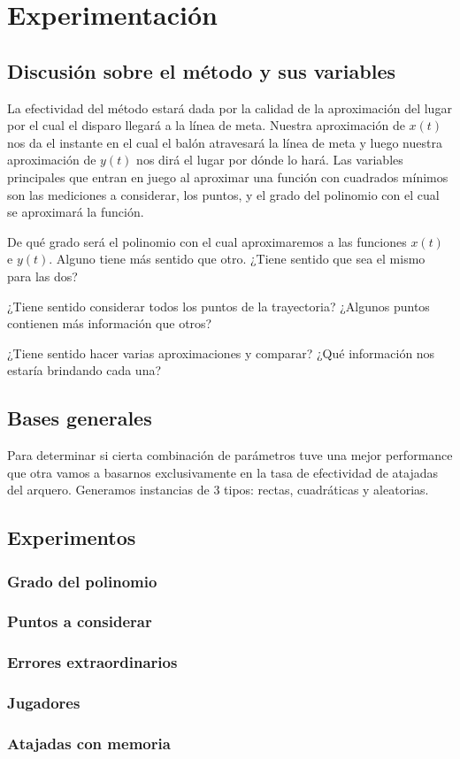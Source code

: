 \section{Experimentación}

\subsection{Discusión sobre el método y sus variables}
La efectividad del método estará dada por la calidad de la aproximación del lugar por el cual el disparo llegará a la línea de meta. 
Nuestra aproximación de $x(t)$ nos da el instante en el cual el balón atravesará la línea de meta y luego nuestra aproximación
de $y(t)$ nos dirá el lugar por dónde lo hará. Las variables principales que entran en juego al aproximar una función con 
cuadrados mínimos son las mediciones a considerar, los puntos, y el grado del polinomio con el cual se aproximará la función.


De qué grado será el polinomio con el cual aproximaremos a las funciones $x(t)$ e $y(t)$. Alguno tiene más sentido que otro. ¿Tiene
sentido que sea el mismo para las dos?

¿Tiene sentido considerar todos los puntos de la trayectoria? ¿Algunos puntos contienen más información que otros?

¿Tiene sentido hacer varias aproximaciones y comparar? ¿Qué información nos estaría brindando cada una?



\subsection{Bases generales}
Para determinar si cierta combinación de parámetros tuve una mejor performance que otra vamos a basarnos exclusivamente en la tasa de
efectividad de atajadas del arquero. Generamos instancias de 3 tipos: rectas, cuadráticas y aleatorias.

\subsection{Experimentos}

\subsubsection{Grado del polinomio}
\subsubsection{Puntos a considerar}
\subsubsection{Errores extraordinarios}
\subsubsection{Jugadores}
\subsubsection{Atajadas con memoria}